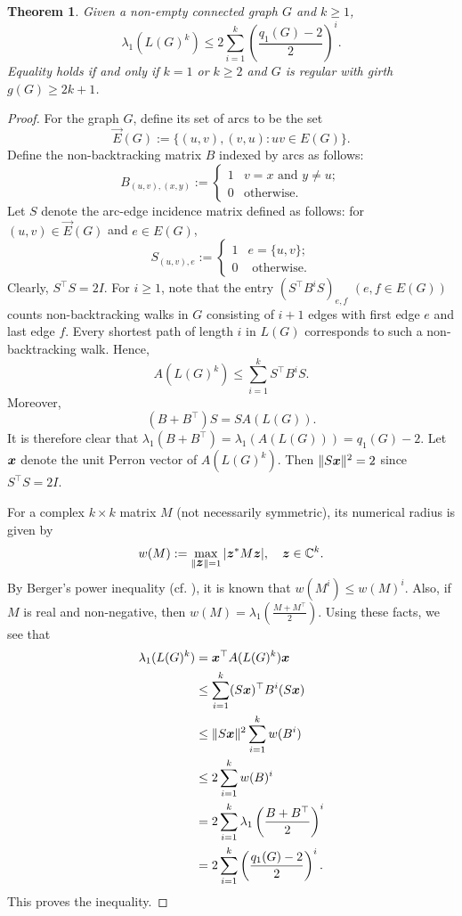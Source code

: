 \documentclass[10pt,a4paper]{article}
\theoremstyle{plain}
\newtheorem{theorem}{Theorem}[section]
\numberwithin{equation}{section}
\def\x{\mbox{\boldmath $x$}}
\def\z{\mbox{\boldmath $z$}}
\begin{document}
\begin{theorem}\label{thm:spectral_radius_line_graph_power} Given a non-empty connected graph $G$ and $k\ge 1$, 
 \[ \lambda_1(L(G)^k)\le 2\sum_{i=1}^k \left(\frac{q_1(G)-2}{2}\right)^i.\]  
 Equality holds if and only if $k=1$ or $k\ge 2$ and $G$ is regular with girth $g(G)\ge 2k+1$. 
\end{theorem}

\begin{proof} For the graph $G$, define its set of arcs to be the set 
\[\overrightarrow{E}(G):=\{(u,v), (v,u): uv\in E(G)\}.\]
Define the non-backtracking matrix $B$ indexed by arcs as follows:
\[ B_{(u,v), (x,y)}:= 
\begin{cases}
    1 & v = x \text{ and }y\ne u;\\
    0 & \text{otherwise}.
\end{cases}\]
Let $S$ denote the arc-edge incidence matrix defined as follows: for $(u,v)\in \overrightarrow{E}(G)$ and $e\in E(G)$, 
\[ S_{(u,v), e} :=
\begin{cases}
    1 & e = \{u,v\};\\
    0 & \text{ otherwise}.
\end{cases}\]
Clearly, $S^\top S = 2I$. For $i\ge 1$, note that the entry $(S^\top B^iS)_{e,f}$ $(e,f\in E(G))$ counts non-backtracking walks in $G$ consisting of $i+1$ edges with first edge $e$ and last edge $f$. Every shortest path of length $i$ in $L(G)$ corresponds to such a non-backtracking walk. Hence, 
\begin{equation}\label{eq:adjacency_line_comparison}
   A(L(G)^k)\le \sum_{i=1}^k S^\top B^iS. 
\end{equation}
Moreover, 
\begin{equation}\label{eq:B_and_L_G}
    (B + B^\top)S = SA(L(G)). 
\end{equation}
It is therefore clear that $\lambda_1(B+B^\top) = \lambda_1(A(L(G))) = q_1(G)-2$. Let $\x$ denote the unit Perron vector of $A(L(G)^k)$. Then $\|S\x\|^2 = 2$ since $S^\top S = 2I$. 

For a complex $k\times k$ matrix $M$ (not necessarily symmetric), its numerical radius is given by 
\[w(M):=\max_{\|\z\|=1}|\z^* M\z|,\quad \z\in \mathbb{C}^k.\]
By Berger's power inequality (cf. \cite{Berger_Stampfli_1967}), it is known that $w(M^i)\le w(M)^i$. Also, if $M$ is real and non-negative, then $w(M) = \lambda_1\left(\frac{M+M^\top}{2}\right)$. Using these facts, we see that 
\begin{align*}
    \lambda_1(L(G)^k) & = \x^\top A(L(G)^k)\x\\
    & \le \sum_{i=1}^k (S\x)^\top B^i (S\x)\\
    & \le \|S\x\|^2 \sum_{i=1}^k  w(B^i)\\
    & \le 2 \sum_{i=1}^k  w(B)^i\\
    & = 2\sum_{i=1}^k \lambda_1\left(\frac{B+B^\top}{2}\right)^i \\
    & = 2\sum_{i=1}^k \left(\frac{q_1(G)-2}{2}\right)^i. 
\end{align*}
This proves the inequality. 


\end{proof}
\end{document}
